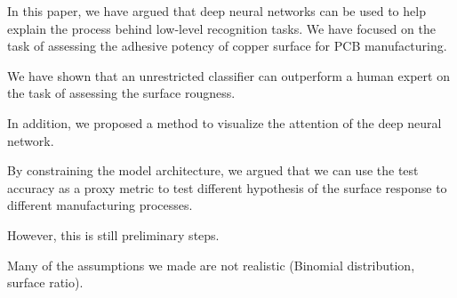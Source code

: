 \documentclass[10pt,twocolumn,letterpaper]{article}
\begin{document}
In this paper, we have argued that deep neural networks can be used to 
help explain the process behind low-level recognition tasks.
We have focused on the task of assessing the adhesive potency of copper surface for PCB manufacturing.

We have shown that an unrestricted classifier can outperform a human expert on the task of assessing the surface rougness.


In addition, we proposed a method to visualize the attention of the deep neural network.


By constraining the model architecture, we argued that we can use the test accuracy 
as a proxy metric to test different hypothesis of the surface response to different manufacturing processes.

However, this is still preliminary steps.

Many of the assumptions we made are not realistic (Binomial distribution, surface ratio).




{\small


}
\end{document}
